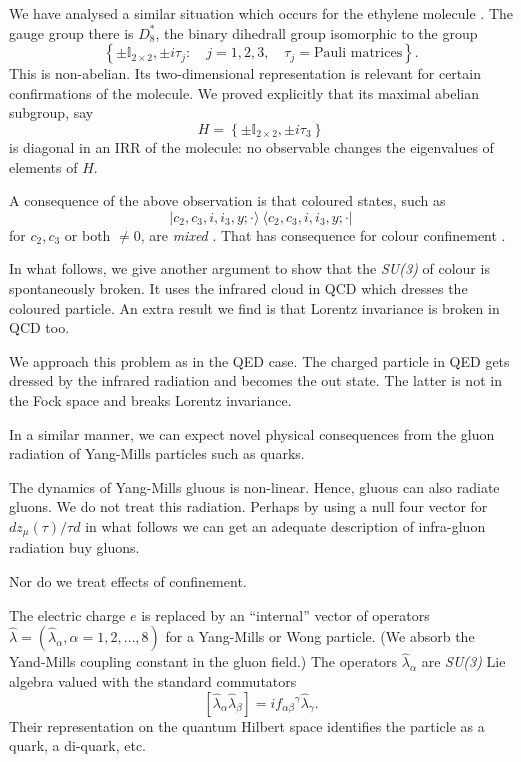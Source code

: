 We have analysed a similar situation which occurs for the ethylene molecule \cite{key10}. The gauge group there is $D^\ast_8$, the binary dihedrall group isomorphic to the group
\begin{equation}
\left\{ \pm \mathbb{I}_{2 \times 2}, \pm i \tau_j :\quad j=1, 2, 3, \quad \tau_j = \text{Pauli matrices}\right\}.\label{chap1-eq3.2}
\end{equation}
This is non-abelian. Its two-dimensional representation is relevant for certain confirmations of the molecule. We proved explicitly that its maximal abelian subgroup, say
\begin{equation}
H = \left\{ \pm \mathbb{I}_{2 \times 2}, \pm  i \tau_3\right\}\label{chap1-eq3.3}
\end{equation}
is diagonal in an IRR of the molecule: no observable changes the eigenvalues of elements of $H$.

A consequence of the above observation is that coloured states, such as
\begin{equation}
|c_2, c_3, i, i_3, y; \cdot \rangle ~ \langle c_2, c_3, i, i_3, y; \cdot | \label{chap1-eq3.4}
\end{equation}
for $c_2, c_3$ or both $\neq 0$, are \textit{mixed} \cite{key4}. That has consequence for colour confinement \cite{key4}.

In what follows, we give another argument to show that the \textit{SU(3)} of colour is spontaneously broken. It uses the infrared cloud in QCD which dresses the coloured particle. An extra result we find is that Lorentz invariance is broken in QCD too.

We approach this problem as in the QED case. The charged particle in QED gets dressed by the infrared radiation and becomes the out state. The latter is not in the Fock space and breaks Lorentz invariance.

In a similar manner, we can expect novel physical consequences from the gluon radiation of Yang-Mills particles such as quarks.

The dynamics of Yang-Mills gluous is non-linear. Hence, gluous can also radiate gluons. We do not treat this radiation. Perhaps by using a null four vector for $dz_\mu (\tau)/\tau d$ in what follows we can get an adequate description of infra-gluon radiation buy gluons.

Nor do we treat effects of confinement.

The electric charge $e$ is replaced by an ``internal'' vector of operators $\hat{\lambda}= (\hat{\lambda}_\alpha, \alpha = 1, 2, \ldots , 8)$ for a Yang-Mills or Wong \cite{key11} particle. (We absorb the Yand-Mills coupling constant in the gluon field.) The operators $\hat{\lambda}_{\alpha}$ are \textit{SU(3)} Lie algebra valued with the standard commutators
\begin{equation}
\left[ \hat{\lambda}_\alpha \hat{\lambda}_\beta \right] = if_{\alpha \beta} {}^\gamma \hat{\lambda}_\gamma. \label{chap1-eq3.5}
\end{equation}
Their representation on the quantum Hilbert space identifies the particle as a quark, a di-quark, etc.

